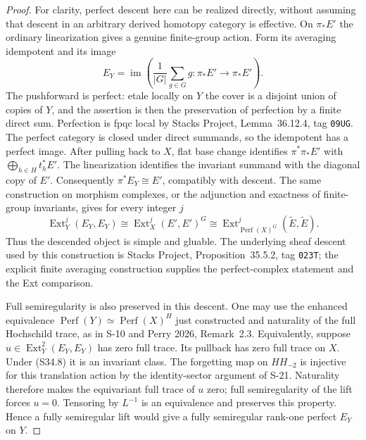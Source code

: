 \begin{proof}
For clarity, perfect descent here can be realized directly,
without assuming that descent in an arbitrary derived
homotopy category is effective. On $\pi_*E'$ the ordinary
linearization gives a genuine finite-group action. Form its
averaging idempotent and its image
\[
 E_Y=\operatorname{im}\left(
  \frac1{|G|}\sum_{g\in G}g:\pi_*E'\longrightarrow\pi_*E'
                         \right).
 \tag{S34.7}
\]
The pushforward is perfect: etale locally on $Y$ the
cover is a disjoint union of copies of $Y$, and the
assertion is then the preservation of perfection by a
finite direct sum. Perfection is fpqc local by Stacks
Project, Lemma~36.12.4, tag \texttt{09UG}.
The perfect category is closed under direct summands, so
the idempotent has a perfect image. After pulling back to
$X$, flat base change identifies $\pi^*\pi_*E'$ with
$\bigoplus_{h\in H}t_h^*E'$. The linearization identifies
the invariant summand with the diagonal copy of $E'$.
Consequently $\pi^*E_Y\cong E'$, compatibly with descent.
The same construction on morphism complexes, or the
adjunction and exactness of finite-group invariants, gives
for every integer $j$
\[
 \operatorname{Ext}^j_Y(E_Y,E_Y)
      \cong \operatorname{Ext}^j_X(E',E')^G
      \cong
      \operatorname{Ext}^j_{\operatorname{Perf}(X)^G}
                   (\widetilde E,\widetilde E).
 \tag{S34.8}
\]
Thus the descended object is simple and gluable. The
underlying sheaf descent used by this construction is
Stacks Project, Proposition~35.5.2, tag \texttt{023T};
the explicit finite averaging construction supplies the
perfect-complex statement and the Ext comparison.

Full semiregularity is also preserved in this descent.
One may use the enhanced equivalence
$\operatorname{Perf}(Y)\simeq
\operatorname{Perf}(X)^H$ just constructed and naturality
of the full Hochschild trace, as in S-10 and Perry 2026,
Remark~2.3. Equivalently, suppose
$u\in\operatorname{Ext}^2_Y(E_Y,E_Y)$ has zero full trace.
Its pullback has zero full trace on $X$. Under (S34.8)
it is an invariant class. The forgetting map on
$HH_{-2}$ is injective for this translation action by
the identity-sector argument of S-21. Naturality
therefore makes the equivariant full trace of $u$ zero;
full semiregularity of the lift forces $u=0$.
Tensoring by $L^{-1}$ is an equivalence and preserves
this property. Hence a fully semiregular lift would
give a fully semiregular rank-one perfect $E_Y$ on $Y$.


\end{proof}

